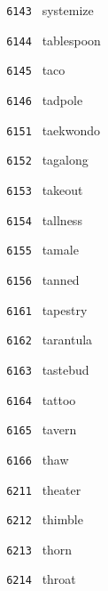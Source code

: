 \documentclass[11pt]{article}
\begin{document}
\begin{multicols}{6}
\noindent \texttt{ 6143 } \hspace{1mm} systemize  \par
\noindent \texttt{ 6144 } \hspace{1mm} tablespoon  \par
\noindent \texttt{ 6145 } \hspace{1mm} taco  \par
\noindent \texttt{ 6146 } \hspace{1mm} tadpole  \par
\noindent \texttt{ 6151 } \hspace{1mm} taekwondo  \par
\noindent \texttt{ 6152 } \hspace{1mm} tagalong  \par
\noindent \texttt{ 6153 } \hspace{1mm} takeout  \par
\noindent \texttt{ 6154 } \hspace{1mm} tallness  \par
\noindent \texttt{ 6155 } \hspace{1mm} tamale  \par
\noindent \texttt{ 6156 } \hspace{1mm} tanned  \par
\noindent \texttt{ 6161 } \hspace{1mm} tapestry  \par
\noindent \texttt{ 6162 } \hspace{1mm} tarantula  \par
\noindent \texttt{ 6163 } \hspace{1mm} tastebud  \par
\noindent \texttt{ 6164 } \hspace{1mm} tattoo  \par
\noindent \texttt{ 6165 } \hspace{1mm} tavern  \par
\noindent \texttt{ 6166 } \hspace{1mm} thaw  \par
\noindent \texttt{ 6211 } \hspace{1mm} theater  \par
\noindent \texttt{ 6212 } \hspace{1mm} thimble  \par
\noindent \texttt{ 6213 } \hspace{1mm} thorn  \par
\noindent \texttt{ 6214 } \hspace{1mm} throat  \par

\end{multicols}
\end{document}
